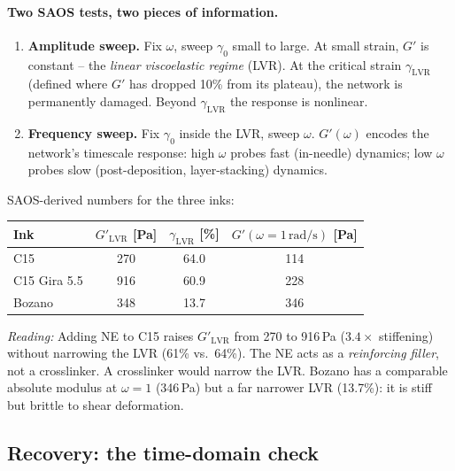 \documentclass[11pt,a4paper]{article}
\begin{document}
\paragraph{Two SAOS tests, two pieces of information.}

\begin{enumerate}[leftmargin=1.6em,itemsep=2pt]
\item \textbf{Amplitude sweep.} Fix $\omega$, sweep $\gamma_0$ small to
large. At small strain, $G'$ is constant -- the \emph{linear viscoelastic
regime} (LVR). At the critical strain $\gamma_\mathrm{LVR}$ (defined where
$G'$ has dropped 10\% from its plateau), the network is permanently
damaged. Beyond $\gamma_\mathrm{LVR}$ the response is nonlinear.
\item \textbf{Frequency sweep.} Fix $\gamma_0$ inside the LVR, sweep
$\omega$. $G'(\omega)$ encodes the network's timescale response: high
$\omega$ probes fast (in-needle) dynamics; low $\omega$ probes slow
(post-deposition, layer-stacking) dynamics.
\end{enumerate}

\begin{examplebox}
SAOS-derived numbers for the three inks:

\medskip\centering
\begin{tabular}{lccc}
\toprule
Ink & $G'_\mathrm{LVR}$ [\si{\Pa}] & $\gamma_\mathrm{LVR}$ [\%] & $G'(\omega=1\,\si{\radian\per\s})$ [\si{\Pa}] \\
\midrule
C15           & 270    & 64.0   & 114 \\
C15 Gira 5.5  & 916    & 60.9   & 228 \\
Bozano        & 348    & 13.7   & 346 \\
\bottomrule
\end{tabular}

\medskip\flushleft
\emph{Reading:} Adding NE to C15 raises $G'_\mathrm{LVR}$ from 270 to
916\,\si{\Pa} ($3.4\times$ stiffening) without narrowing the LVR (61\%
vs.\ 64\%). The NE acts as a \emph{reinforcing filler}, not a
crosslinker. A crosslinker would narrow the LVR. Bozano has a comparable
absolute modulus at $\omega=1$ (346\,\si{\Pa}) but a far narrower LVR
(13.7\%): it is stiff but brittle to shear deformation.
\end{examplebox}

\subsection{Recovery: the time-domain check}
\end{document}
